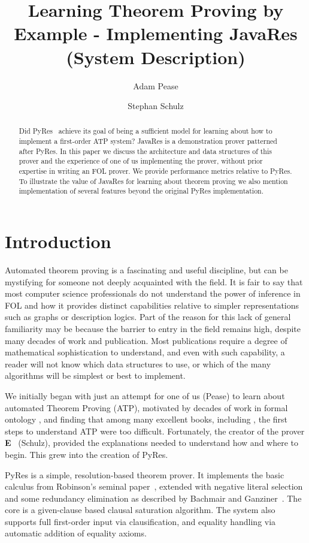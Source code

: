\documentclass{llncs}
\title{Learning Theorem Proving by Example - Implementing JavaRes (System Description)}
\author{Adam Pease\inst{2}
        \and Stephan Schulz\inst{1}
  }
\institute{
  Articulate Software, USA,
  \email{\tt apease@articulatesoftware.com}
  \and
  DHBW Stuttgart, Germany,
  \email{\tt schulz@eprover.org}
}
\begin{document}
\maketitle


\begin{abstract}
  Did PyRes~\cite{SP:IJCAR-2020} achieve its goal of being a
  sufficient model for learning about how to implement a first-order
  ATP system?  JavaRes is a demonstration prover patterned after
  PyRes.  In this paper we discuss
  the architecture and data structures of this prover and the
  experience of one of us implementing the prover, without prior
  expertise in writing an FOL prover.  We provide performance metrics
  relative to PyRes.  To illustrate the
  value of JavaRes for learning about theorem proving we also mention
  implementation of several features beyond the original PyRes implementation.
\end{abstract}

\section{Introduction}

Automated theorem proving is a fascinating and useful discipline, but
can be mystifying for someone not deeply acquainted with the field.
It is fair to say that most computer science professionals do not
understand the power of inference in FOL and how it provides distinct
capabilities relative to simpler representations such as graphs or
description logics.  Part of the reason for this lack of general
familiarity may be because the barrier to entry in the field remains
high, despite many decades of work and publication.  Most publications
require a degree of mathematical sophistication to understand, and
even with such capability, a reader will not know which data
structures to use, or which of the many algorithms will be simplest or
best to implement.

We initially began with just an attempt for one of us (Pease) to learn
about automated Theorem Proving (ATP), motivated by decades of work in
formal ontology \cite{np01,p11}, and finding that among many excellent
books, including \cite{Harrison:HPL-2009}, the first steps to
understand ATP were too difficult.  Fortunately, the creator of the
prover \textbf{E}~\cite{Schulz:AICOM-2002,SCV:CADE-2019} (Schulz),
provided the explanations needed to understand how and where to begin.
This grew into the creation of PyRes.

PyRes is a simple, resolution-based theorem prover. It implements the
basic calculus from Robinson's seminal paper~\cite{Ro65}, extended
with negative literal selection and some redundancy elimination as
described by Bachmair and Ganziner~\cite{BG:HBAR-2001}. The core is a
given-clause based clausal saturation algorithm. The system also
supports full first-order input via clausification, and equality
handling via automatic addition of equality axioms.
\end{document}
